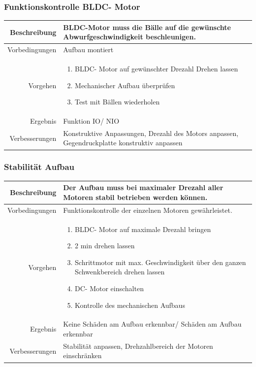 \subsubsection{Funktionskontrolle BLDC- Motor}
\begin{table}[h!]
	\renewcommand{\arraystretch}{1.5}
	\begin{tabular}{|r|p{14cm}|}
		\hline Beschreibung & BLDC-Motor muss die Bälle auf die gewünschte Abwurfgeschwindigkeit beschleunigen.  \\ 
		\hline Vorbedingungen & Aufbau montiert \\ 
		\hline Vorgehen & 
		\begin{enumerate}
			\item BLDC- Motor auf gewünschter Drezahl Drehen lassen 
			\item Mechanischer Aufbau überprüfen
			\item Test mit Bällen wiederholen 
		\end{enumerate} \\ 
		\hline Ergebnis & Funktion IO/ NIO \\ 
		\hline Verbesserungen & Konstruktive Anpassungen, Drezahl des Motors anpassen, Gegendruckplatte konstruktiv anpassen \\ 
		\hline 
	\end{tabular}
\end{table}

\subsubsection{Stabilität Aufbau}
\begin{table}[h!]
	\renewcommand{\arraystretch}{1.5}
	\begin{tabular}{|r|p{14cm}|}
		\hline Beschreibung & Der Aufbau muss bei maximaler Drezahl aller Motoren stabil betrieben werden können. \\ 
		\hline Vorbedingungen & Funktionskontrolle der einzelnen Motoren gewährleistet. \\ 
		\hline Vorgehen & 
		\begin{enumerate}
			\item BLDC- Motor auf maximale Drezahl bringen
			\item 2 min drehen lassen 
			\item Schrittmotor mit max. Geschwindigkeit über den ganzen Schwenkbereich drehen lassen  
			\item DC- Motor einschalten
			\item Kontrolle des mechanischen Aufbaus
		\end{enumerate} \\ 
		\hline Ergebnis & Keine Schäden am Aufbau erkennbar/ Schäden am Aufbau erkennbar \\ 
		\hline Verbesserungen & Stabilität anpassen, Drehzahlbereich der Motoren einschränken \\ 
		\hline 
	\end{tabular}
\end{table}

